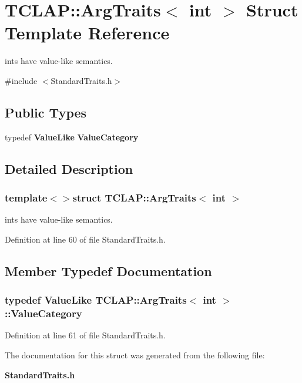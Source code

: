 \section{T\+C\+L\+A\+P\+:\+:Arg\+Traits$<$ int $>$ Struct Template Reference}
\label{structTCLAP_1_1ArgTraits_3_01int_01_4}


ints have value-\/like semantics.  




{\ttfamily \#include $<$Standard\+Traits.\+h$>$}

\subsection*{Public Types}
\begin{DoxyCompactItemize}
\item 
typedef {\bf Value\+Like} {\bf Value\+Category}
\end{DoxyCompactItemize}


\subsection{Detailed Description}
\subsubsection*{template$<$$>$struct T\+C\+L\+A\+P\+::\+Arg\+Traits$<$ int $>$}

ints have value-\/like semantics. 

Definition at line 60 of file Standard\+Traits.\+h.



\subsection{Member Typedef Documentation}
\subsubsection[{Value\+Category}]{\setlength{\rightskip}{0pt plus 5cm}typedef {\bf Value\+Like} {\bf T\+C\+L\+A\+P\+::\+Arg\+Traits}$<$ int $>$\+::{\bf Value\+Category}}\label{structTCLAP_1_1ArgTraits_3_01int_01_4_a8e577764b626e9e928d71567123d92a9}


Definition at line 61 of file Standard\+Traits.\+h.



The documentation for this struct was generated from the following file\+:\begin{DoxyCompactItemize}
\item 
{\bf Standard\+Traits.\+h}\end{DoxyCompactItemize}
